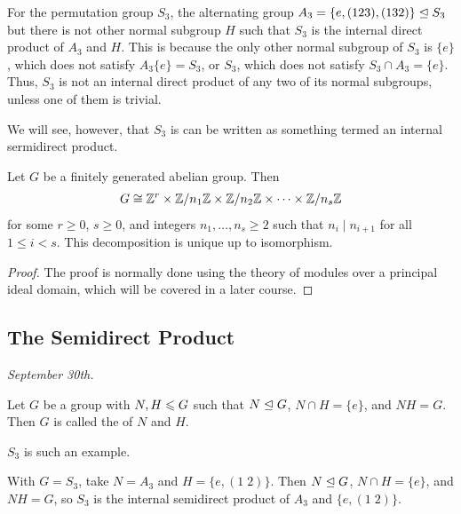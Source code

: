 \begin{example}
    For the permutation group $S_{3}$, the alternating group $A_{3} = \{e,(123),(132)\} \trianglelefteq S_{3}$ but there is not other normal subgroup $H$ such that $S_{3}$ is the internal direct product of $A_{3}$ and $H$. This is because the only other normal subgroup of $S_{3}$ is $\{e\}$, which does not satisfy $A_{3}\{e\} = S_{3}$, or $S_{3}$, which does not satisfy $S_{3} \cap A_{3} = \{e\}$. Thus, $S_{3}$ is not an internal direct product of any two of its normal subgroups, unless one of them is trivial.
\end{example}

We will see, however, that $S_{3}$ is can be written as something termed an internal sermidirect product.

\begin{theorem}
    Let $G$ be a finitely generated abelian group. Then
    \begin{align}
        G \cong \mathbb{Z}^{r} \times \mathbb{Z}/n_{1}\mathbb{Z} \times \mathbb{Z}/n_{2}\mathbb{Z} \times \cdots \times \mathbb{Z}/n_{s}\mathbb{Z}
    \end{align}
    for some $r \geq 0$, $s \geq 0$, and integers $n_{1},\ldots,n_{s} \geq 2$ such that $n_{i} \mid n_{i+1}$ for all $1 \leq i < s$. This decomposition is unique up to isomorphism.
\end{theorem}
\begin{proof}
    The proof is normally done using the theory of modules over a principal ideal domain, which will be covered in a later course.
\end{proof}


\subsection{The Semidirect Product}

\textit{September 30th.}

\begin{definition}
    Let $G$ be a group with $N,H \leqslant G$ such that $N \trianglelefteq G$, $N \cap H = \{e\}$, and $NH = G$. Then $G$ is called the  of $N$ and $H$.
\end{definition}

$S_{3}$ is such an example.

\begin{example}
    With $G = S_{3}$, take $N = A_{3}$ and $H = \{e,(1\;2)\}$. Then $N \trianglelefteq G$, $N \cap H = \{e\}$, and $NH = G$, so $S_{3}$ is the internal semidirect product of $A_{3}$ and $\{e,(1\;2)\}$.
\end{example}

